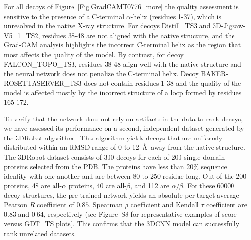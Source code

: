 \documentclass{bioinfo}
\begin{document}
For all decoys of Figure~\ref{Fig:GradCAMT0776_more} the quality
assessment is sensitive to the presence of a C-terminal $\alpha$-helix
(residues 1-37), which is unresolved in the native X-ray
structure. For decoys Distill\_TS3 and 3D-Jigsaw-V5\_1\_TS2, residues
38-48 are not aligned with the native structure, and the Grad-CAM
analysis highlights the incorrect C-terminal helix as the region that
most affects the quality of the model.
%
%
By contrast, for decoy FALCON\_TOPO\_TS3, residues 38-48 align well
with the native structure and the neural network does not penalize the
C-terminal helix.
%
%
Decoy BAKER-ROSETTASERVER\_TS3 does not contain residues 1-38 and the
quality of the model is affected mostly by the incorrect structure of
a loop formed by residues 165-172.
%
%

To verify that the network does not rely on artifacts in the data to
rank decoys, we have assessed its performance on a second, independent
dataset generated by the 3DRobot algorithm \citep{deng20163drobot}.
This algorithm yields decoys that are uniformly distributed within an
RMSD range of 0 to 12~\AA\ away from the native structure.
%
The 3DRobot dataset consists of 300 decoys for each of 200
single-domain proteins selected from the PDB. The proteins have less
than 20\% sequence identity with one another and are between 80 to 250
residue long. Out of the 200 proteins, 48 are all-$\alpha$ proteins,
40 are all-$\beta$, and 112 are $\alpha/\beta$.
%
For these 60000 decoy structures, the pre-trained network yields an
absolute per-target average Pearson $R$ coefficient of $0.85$.
Spearman $\rho$ coefficient and Kendall $\tau$ coefficient are $0.83$
and $0.64$, respectively (see Figure~S8 for representative examples of
score versus GDT\_TS plots). This confirms that the 3DCNN model
can successfully rank unrelated datasets.
\end{document}
